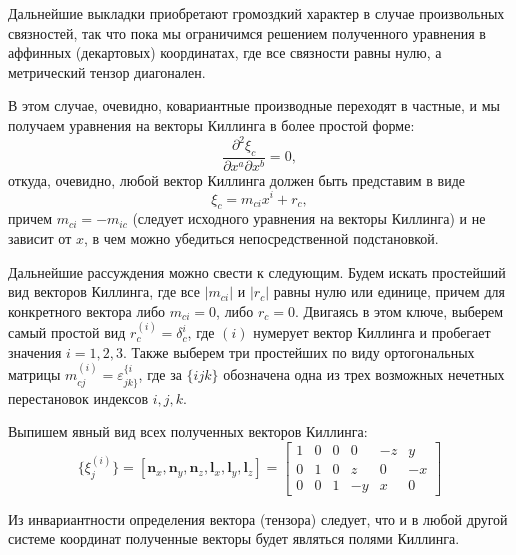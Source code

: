 \documentclass[12pt,a4paper]{article}
\newcommand{\V}[1]{\mathbf{#1}}
\begin{document}
        Дальнейшие выкладки приобретают громоздкий характер в случае произвольных связностей, так что пока мы ограничимся решением полученного уравнения в аффинных (декартовых) координатах, где все связности равны нулю, а метрический тензор диагонален.

        В этом случае, очевидно, ковариантные производные переходят в частные, и мы получаем уравнения на векторы Киллинга в более простой форме:
        \begin{equation}
            \frac{\partial^2 \xi_c}{\partial x^a \partial x^b} = 0,
        \end{equation}
        откуда, очевидно, любой вектор Киллинга должен быть представим в виде
        \begin{equation}
            \xi_c = m_{ci} x^i + r_c,
        \end{equation}
        причем $m_{ci} = - m_{ic}$ (следует исходного уравнения на векторы Киллинга) и не зависит от $x$, в чем можно убедиться непосредственной подстановкой.

        Дальнейшие рассуждения можно свести к следующим. Будем искать простейший вид векторов Киллинга, где все $|m_{ci}|$ и $|r_c|$ равны нулю или единице, причем для конкретного вектора либо $m_{ci} = 0$, либо $r_c = 0$. Двигаясь в этом ключе, выберем самый простой вид $r^{(i)}_c = \delta^i_c$, где $(i)$ нумерует вектор Киллинга и пробегает значения $i = 1,2,3$. Также выберем три простейших по виду ортогональных матрицы $m^{(i)}_{cj} = \varepsilon^{\{i}_{jk\}}$, где за $\{ijk\}$ обозначена одна из трех возможных нечетных перестановок индексов $i,j,k$.

        Выпишем явный вид всех полученных векторов Киллинга:
        \begin{equation}
            \{ \xi^{(i)}_j \}
            =
            \left[
                \V{n}_x, \V{n}_y, \V{n}_z,
                \V{l}_x, \V{l}_y, \V{l}_z
            \right]
            =
            \begin{bmatrix}
                1 & 0 & 0 & 0  & -z & y  \\
                0 & 1 & 0 & z  & 0  & -x \\
                0 & 0 & 1 & -y & x  & 0
            \end{bmatrix}
        \end{equation}

        Из инвариантности определения вектора (тензора) следует, что и в любой другой системе координат полученные векторы будет являться полями Киллинга.
\end{document}
